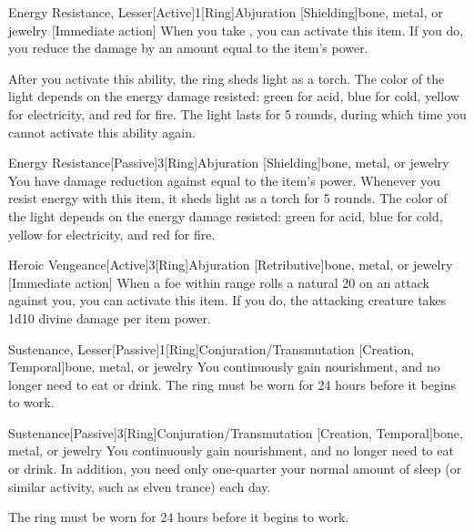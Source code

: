 \begin{magicitemdef}{Energy Resistance, Lesser}[Active]{1}[Ring]{Abjuration [Shielding]}{bone, metal, or jewelry}
    [Immediate action] When you take , you can activate this item. If you do, you reduce the damage by an amount equal to the item's power.

    After you activate this ability, the ring sheds light as a torch.
    The color of the light depends on the energy damage resisted: green for acid, blue for cold, yellow for electricity, and red for fire.
    The light lasts for 5 rounds, during which time you cannot activate this ability again.
\end{magicitemdef}

\begin{magicitemdef}{Energy Resistance}[Passive]{3}[Ring]{Abjuration [Shielding]}{bone, metal, or jewelry}
     You have damage reduction against  equal to the item's power.
    Whenever you resist energy with this item, it sheds light as a torch for 5 rounds.
    The color of the light depends on the energy damage resisted: green for acid, blue for cold, yellow for electricity, and red for fire.
\end{magicitemdef}

\begin{magicitemdef}{Heroic Vengeance}[Active]{3}[Ring]{Abjuration [Retributive]}{bone, metal, or jewelry}
    [Immediate action] When a foe within \rngmed range rolls a natural 20 on an attack against you, you can activate this item. If you do, the attacking creature takes 1d10 divine damage per item power.
\end{magicitemdef}

\begin{magicitemdef}{Sustenance, Lesser}[Passive]{1}[Ring]{Conjuration/Transmutation [Creation, Temporal]}{bone, metal, or jewelry}
     You continuously gain nourishment, and no longer need to eat or drink.
    The ring must be worn for 24 hours before it begins to work.
\end{magicitemdef}

\begin{magicitemdef}{Sustenance}[Passive]{3}[Ring]{Conjuration/Transmutation [Creation, Temporal]}{bone, metal, or jewelry}
     You continuously gain nourishment, and no longer need to eat or drink.
    In addition, you need only one-quarter your normal amount of sleep (or similar activity, such as elven trance) each day.

    The ring must be worn for 24 hours before it begins to work.
\end{magicitemdef}


